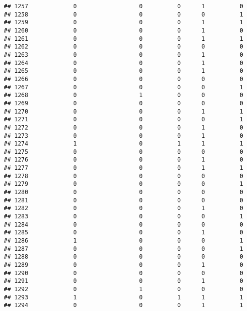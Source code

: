 \documentclass[
]{article}
\begin{document}
\begin{verbatim}
## 1257             0                  0          0      1          0
## 1258             0                  0          0      0          1
## 1259             0                  0          0      1          1
## 1260             0                  0          0      1          0
## 1261             0                  0          0      1          1
## 1262             0                  0          0      0          0
## 1263             0                  0          0      1          0
## 1264             0                  0          0      1          0
## 1265             0                  0          0      1          0
## 1266             0                  0          0      0          0
## 1267             0                  0          0      0          1
## 1268             0                  1          0      0          0
## 1269             0                  0          0      0          0
## 1270             0                  0          0      1          1
## 1271             0                  0          0      0          1
## 1272             0                  0          0      1          0
## 1273             0                  0          0      1          0
## 1274             1                  0          1      1          1
## 1275             0                  0          0      0          0
## 1276             0                  0          0      1          0
## 1277             0                  0          0      1          1
## 1278             0                  0          0      0          0
## 1279             0                  0          0      0          1
## 1280             0                  0          0      0          0
## 1281             0                  0          0      0          0
## 1282             0                  0          0      1          0
## 1283             0                  0          0      0          1
## 1284             0                  0          0      0          0
## 1285             0                  0          0      1          0
## 1286             1                  0          0      0          1
## 1287             0                  0          0      0          1
## 1288             0                  0          0      0          0
## 1289             0                  0          0      1          0
## 1290             0                  0          0      0          0
## 1291             0                  0          0      1          0
## 1292             0                  1          0      0          0
## 1293             1                  0          1      1          1
## 1294             0                  0          0      1          1

\end{verbatim}
\end{document}
